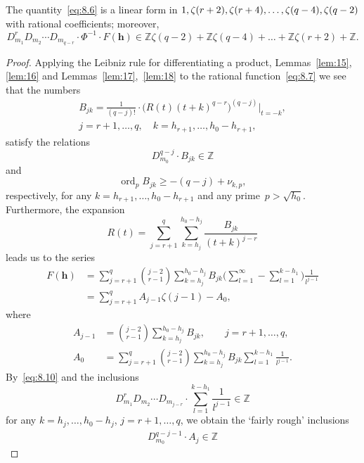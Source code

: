 \documentclass[a4paper,twoside]{article}
\numberwithin{equation}{section}
\renewcommand{\[}{\lfloor}
\renewcommand{\]}{\rfloor}
\newcommand{\<}{\langle}
\renewcommand{\>}{\rangle}
\DeclareMathOperator{\ord}{ord}
\newcommand{\rom}[1]{{\rm#1}}
\newcommand{\bh}{\boldsymbol h}
\begin{document}
\begin{lemma}
\label{lem:19}
The quantity~\eqref{eq:8.6} is a linear form in
$1,\zeta(r+2),\zeta(r+4),\dots,\linebreak[4]\zeta(q-4),\zeta(q-2)$
with rational coefficients\rom;
moreover\rom,
$$
D_{m_1}^rD_{m_2}\dotsb D_{m_{q-r}}
\cdot\Phi^{-1}\cdot F(\bh)
\in\mathbb Z\zeta(q-2)+\mathbb Z\zeta(q-4)+\dots
+\mathbb Z\zeta(r+2)+\mathbb Z.
$$
\end{lemma}

\begin{proof}
Applying the Leibniz rule for differentiating a product,
Lemmas~\ref{lem:15}, \ref{lem:16}
and Lemmas~\ref{lem:17},~\ref{lem:18}
to the rational function~\eqref{eq:8.7}
we see that the numbers
$$
\begin{gathered}
B_{jk}=\frac1{(q-j)!}
\cdot\bigl(R(t)(t+k)^{q-r}\bigr)^{(q-j)}\big|_{t=-k},
\\
j=r+1,\dots,q, \quad k=h_{r+1},\dots,h_0-h_{r+1},
\end{gathered}
$$
satisfy the relations
\begin{equation}
D_{m_0}^{q-j}\cdot B_{jk}\in\mathbb Z
\label{eq:8.10}
\end{equation}
and
\begin{equation}
\ord_pB_{jk}
\ge-(q-j)+\nu_{k,p},
\label{eq:8.11}
\end{equation}
respectively, for any $k=h_{r+1},\dots,h_0-h_{r+1}$
and any prime~$p>\sqrt{h_0}$.
Furthermore, the expansion
$$
R(t)=\sum_{j=r+1}^q\sum_{k=h_j}^{h_0-h_j}\frac{B_{jk}}{(t+k)^{j-r}}
$$
leads us to the series
\begin{align*}
F(\bh)
&=\sum_{j=r+1}^q\binom{j-2}{r-1}
\sum_{k=h_j}^{h_0-h_j}B_{jk}
\biggl(\sum_{l=1}^\infty-\sum_{l=1}^{k-h_1}\biggr)\frac1{l^{j-1}}
\\
&=\sum_{j=r+1}^qA_{j-1}\zeta(j-1)-A_0,
\end{align*}
where
\begin{align}
A_{j-1}&=\binom{j-2}{r-1}\sum_{k=h_j}^{h_0-h_j}B_{jk},
\qquad j=r+1,\dots,q,
\label{eq:8.12}
\\
A_0&=\sum_{j=r+1}^q\binom{j-2}{r-1}
\sum_{k=h_j}^{h_0-h_j}B_{jk}
\sum_{l=1}^{k-h_1}\frac1{l^{j-1}}.
\nonumber
\end{align}
By~\eqref{eq:8.10} and the inclusions
$$
D_{m_1}^rD_{m_2}\dotsb D_{m_{j-r}}
\cdot\sum_{l=1}^{k-h_1}\frac1{l^{j-1}}\in\mathbb Z
$$
for any $k=h_j,\dots,h_0-h_j$, $j=r+1,\dots,q$,
we obtain the `fairly rough' inclusions
\begin{gather*}
D_{m_0}^{q-j-1}\cdot A_j\in\mathbb Z

\end{gather*}
\end{proof}
\end{document}
